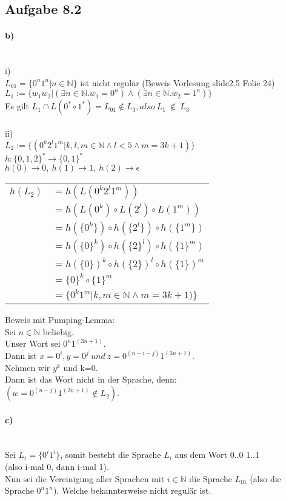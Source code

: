 \documentclass[11pt,a4paper]{article}
\begin{document}
\subsection*{Aufgabe 8.2}
\paragraph*{b)}\ \\
i)\\
$L_{01}=\{0^n1^n|n \in \mathbb{N}\}$ ist nicht regulär (Beweis Vorlesung slide2.5 Folie 24)\\
$L_1 := \{w_1w_2|( \exists n \in \mathbb{N} . w_1 = 0^n) \wedge (\exists n \in \mathbb{N}.w_2 = 1^n)\}$\\
Es gilt $L_1 \cap L(0^* \circ 1^*) = L_{01} \notin L_3,also ~ L_1 ~ \notin ~ L_3$\\
\ \\ 
ii)\\
$L_2 := \{(0^k2^l1^m|k,l,m \in \mathbb{N} \wedge l < 5 \wedge m=3k+1)\}$\\
$h: \{0,1,2\}^* \rightarrow \{0,1\}^* $\\
$h(0) \rightarrow 0,~h(1) \rightarrow 1,~ h(2) \rightarrow \epsilon$\\
\begin{tabular}{ll}
$h(L_2)$&$=h(L(0^k2^l1^m))$\\
&$=h(L(0^k) \circ L(2^l) \circ L(1^m))$\\
&$=h(\{0^k\}) \circ h(\{2^l\}) \circ h(\{1^m\})$\\
&$=h(\{0\}^k) \circ h(\{2\}^l) \circ h(\{1\}^m)$\\
&$=h(\{0\})^k \circ h(\{2\})^l \circ h(\{1\})^m$\\
&$=\{0\}^k \circ \{1\}^m$\\
&$=\{0^k1^m|k,m \in \mathbb{N} \wedge m=3k+1)\}$\\
\end{tabular}
\newpage
Beweis mit Pumping-Lemma:\\
Sei $n \in \mathbb{N}$ beliebig.\\

Unser Wort sei $0^n 1^{(3n+1)}$.\\
Dann ist $x = 0^i, y = 0^j ~ und ~ z = 0^{(n-i-j)} 1^{(3n+1)}$.\\
Nehmen wir $y^k$ und k=0.\\ 
Dann ist das Wort nicht in der Sprache, denn:\\
$(w=0^{(n-j)} 1^{(3n+1)} \notin L_2 )$.\\
\paragraph*{c)}\ \\
Sei $L_i = \{0^i 1^i\}$, somit besteht die Sprache $L_i$ aus dem Wort 0..0 1..1\\ (also i-mal 0, dann i-mal 1).\\
Nun sei die Vereinigung aller Sprachen mit $i \in \mathbb{N}$ die Sprache $L_{01}$ (also die Sprache $0^n 1^n$). Welche bekannterweise nicht regulär ist.
\end{document}
